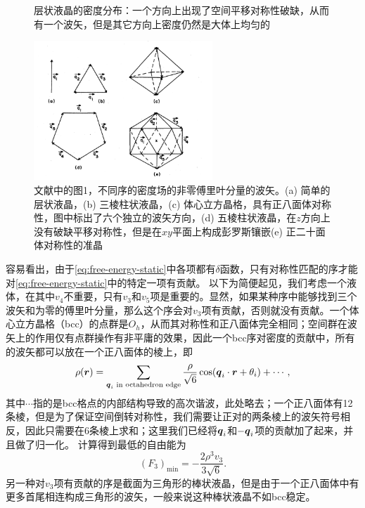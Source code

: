 \documentclass[hyperref, UTF8, a4paper]{ctexart}
\begin{document}
\begin{figure}
    \centering
    
    \caption{层状液晶的密度分布：一个方向上出现了空间平移对称性破缺，从而有一个波矢，但是其它方向上密度仍然是大体上均匀的}
    \label{fig:smectic}
\end{figure}

\begin{figure}
    \centering
    \includegraphics[width=0.6\textwidth]{wavevector.PNG}
    \caption{文献\cite{PhysRevB.32.5764}中的图1，不同序的密度场的非零傅里叶分量的波矢。(a) 简单的层状液晶，(b) 三棱柱状液晶，(c) 体心立方晶格，具有正八面体对称性，图中标出了六个独立的波矢方向，(d) 五棱柱状液晶，在$z$方向上没有破缺平移对称性，但是在$xy$平面上构成彭罗斯镶嵌(e) 正二十面体对称性的准晶}
    \label{fig:wavevectors}
\end{figure}

容易看出，由于\eqref{eq:free-energy-static}中各项都有$\delta$函数，只有对称性匹配的序才能对\eqref{eq:free-energy-static}中的特定一项有贡献。
以下为简便起见，我们考虑一个液体，在其中$v_4$不重要，只有$v_3$和$v_5$项是重要的。显然，如果某种序中能够找到三个波矢和为零的傅里叶分量，那么这个序会对$v_3$项有贡献，否则就没有贡献。一个体心立方晶格（bcc）的点群是$O_h$，从而其对称性和正八面体完全相同；空间群在波矢上的作用仅有点群操作有非平庸的效果，因此一个bcc序对密度的贡献中，所有的波矢都可以放在一个正八面体的棱上，即
\begin{equation}
    \rho(\vb*{r}) = \sum_\text{$\vb*{q}_i$ in octahedron edge} \frac{\rho}{\sqrt{6}} \cos(\vb*{q}_i \cdot \vb*{r} + \theta_i) + \cdots,
\end{equation}
其中$\cdots$指的是bcc格点的内部结构导致的高次谐波，此处略去；一个正八面体有12条棱，但是为了保证空间倒转对称性，我们需要让正对的两条棱上的波矢符号相反，因此只需要在6条棱上求和；这里我们已经将$\vb*{q}_i$和$-\vb*{q}_i$项的贡献加了起来，并且做了归一化。
计算得到最低的自由能为
\begin{equation}
    (F_3)_\text{min} = - \frac{2 \rho^3 v_3}{3 \sqrt{6}}.
    \label{eq:bcc-free-energy}
\end{equation}
另一种对$v_3$项有贡献的序是截面为三角形的棒状液晶，但是由于一个正八面体中有更多首尾相连构成三角形的波矢，一般来说这种棒状液晶不如bcc稳定。
\end{document}
